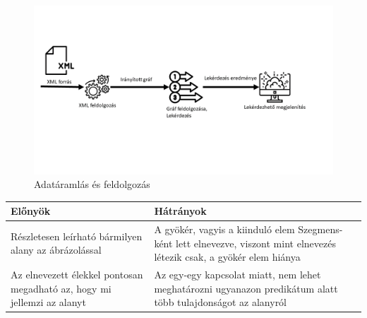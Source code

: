 \begin{figure}[h]
	\includegraphics[scale=0.45]{images/presentation/data_flow.png}
	\caption{Adatáramlás és feldolgozás}
	\label{fig:flow1}
\end{figure}

\begin{center}
	\begin{tabular}{ |p{7cm}|p{7cm}| }
		\hline
		Előnyök & Hátrányok\\
		\hline
		Részletesen leírható bármilyen alany az ábrázolással & A gyökér, vagyis a kiinduló elem Szegmens-ként lett elnevezve, viszont mint elnevezés létezik csak, a gyökér elem hiánya \\ 
		\hline
		Az elnevezett élekkel pontosan megadható az, hogy mi jellemzi az alanyt & Az egy-egy kapcsolat miatt, nem lehet meghatározni ugyanazon predikátum alatt több tulajdonságot az alanyról\\
		\hline
	\end{tabular}
\end{center}

